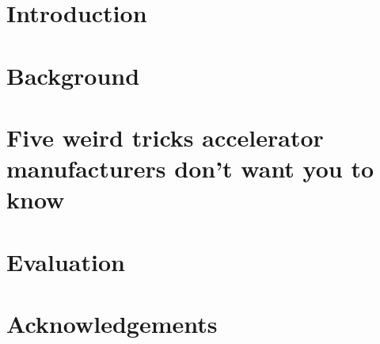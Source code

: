 \documentclass[sigconf,techreport]{acmart}
\begin{document}




\maketitle

\tableofcontents

\section{Introduction}\label{sec:introduction}


\section{Background}\label{sec:background}


\section{Five weird tricks accelerator manufacturers don't want you to know}\label{sec:methodology}


\section{Evaluation}\label{sec:evaluation}


\section{Acknowledgements}



\end{document}
